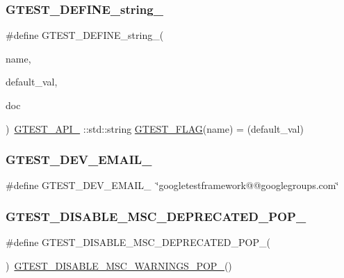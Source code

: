 \subsubsection{\texorpdfstring{GTEST\_DEFINE\_string\_}{GTEST\_DEFINE\_string\_}}
{\footnotesize\ttfamily \#define G\+T\+E\+S\+T\+\_\+\+D\+E\+F\+I\+N\+E\+\_\+string\+\_\+(\begin{DoxyParamCaption}\item[{}]{name,  }\item[{}]{default\+\_\+val,  }\item[{}]{doc }\end{DoxyParamCaption})~\mbox{\hyperlink{_obj__test_2lib_2googletest-release-1_88_81_2googletest_2include_2gtest_2internal_2gtest-port_8h_aa73be6f0ba4a7456180a94904ce17790}{G\+T\+E\+S\+T\+\_\+\+A\+P\+I\+\_\+}} \+::std\+::string \mbox{\hyperlink{_obj__test_2lib_2googletest-release-1_88_81_2googletest_2include_2gtest_2internal_2gtest-port_8h_a828f4e34a1c4b510da50ec1563e3562a}{G\+T\+E\+S\+T\+\_\+\+F\+L\+AG}}(name) = (default\+\_\+val)}

\mbox{\label{_obj__test_2lib_2googletest-master_2googletest_2include_2gtest_2internal_2gtest-port_8h_a21086d276b1a64d6763ee8a94b12c1b8}} 
\subsubsection{\texorpdfstring{GTEST\_DEV\_EMAIL\_}{GTEST\_DEV\_EMAIL\_}}
{\footnotesize\ttfamily \#define G\+T\+E\+S\+T\+\_\+\+D\+E\+V\+\_\+\+E\+M\+A\+I\+L\+\_\+~\char`\"{}googletestframework@@googlegroups.\+com\char`\"{}}

\mbox{\label{_obj__test_2lib_2googletest-master_2googletest_2include_2gtest_2internal_2gtest-port_8h_aa0dc86dc9837f1610e91da65458f53b3}} 
\subsubsection{\texorpdfstring{GTEST\_DISABLE\_MSC\_DEPRECATED\_POP\_}{GTEST\_DISABLE\_MSC\_DEPRECATED\_POP\_}}
{\footnotesize\ttfamily \#define G\+T\+E\+S\+T\+\_\+\+D\+I\+S\+A\+B\+L\+E\+\_\+\+M\+S\+C\+\_\+\+D\+E\+P\+R\+E\+C\+A\+T\+E\+D\+\_\+\+P\+O\+P\+\_\+(\begin{DoxyParamCaption}{ }\end{DoxyParamCaption})~\mbox{\hyperlink{_obj__test_2lib_2googletest-release-1_88_81_2googletest_2include_2gtest_2internal_2gtest-port_8h_ab4c44546d6d9aced68993b87b608fc06}{G\+T\+E\+S\+T\+\_\+\+D\+I\+S\+A\+B\+L\+E\+\_\+\+M\+S\+C\+\_\+\+W\+A\+R\+N\+I\+N\+G\+S\+\_\+\+P\+O\+P\+\_\+}}()}

